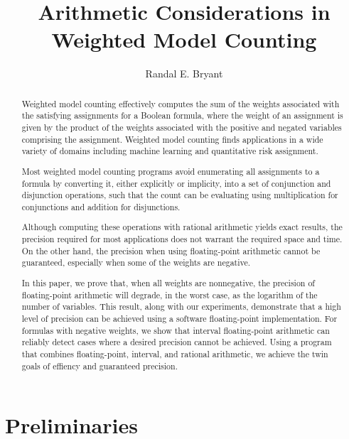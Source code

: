 \documentclass[letterpaper,USenglish,cleveref, autoref, thm-restate]{lipics-v2021}
\title{Arithmetic Considerations in Weighted Model Counting}
\author{Randal E. Bryant}{Computer Science Department, Carnegie Mellon University, Pittsburgh, PA 15213 USA}{Randy.Bryant@cs.cmu.edu}{https://orcid.org/0000-0001-5024-6613}{}
\begin{document}
\maketitle

\begin{abstract}
  Weighted model counting effectively computes the sum of the weights
  associated with the satisfying assignments for a Boolean formula,
  where the weight of an assignment is given by the product of the
  weights associated with the positive and negated variables
  comprising the assignment.  Weighted model counting finds
  applications in a wide variety of domains including machine learning
  and quantitative risk assignment.

  Most weighted model counting programs avoid enumerating all
  assignments to a formula by converting it, either explicitly or
  implicity, into a set of conjunction and disjunction operations,
  such that the count can be evaluating using multiplication for
  conjunctions and addition for disjunctions.

  Although computing these operations with rational arithmetic
  yields exact results, the precision required for most applications
  does not warrant the required space and time.  On
  the other hand, the precision when using floating-point arithmetic
  cannot be guaranteed, especially when some of the weights are
  negative.

  In this paper, we prove that, when all weights are nonnegative, the
  precision of floating-point arithmetic will degrade, in the worst case, as the logarithm
  of the number of variables.  This result, along with our
  experiments, demonstrate that a high level of precision can be
  achieved using a software floating-point implementation.  For
  formulas with negative weights, we show that interval floating-point
  arithmetic can reliably detect cases where a desired precision
  cannot be achieved.  Using a program that combines floating-point,
  interval, and rational arithmetic, we achieve the twin goals of
  effiency and guaranteed precision.
\end{abstract}

\section{Preliminaries}
\end{document}
